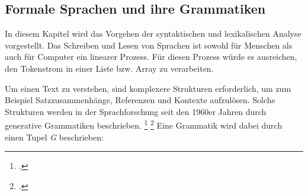 




\pagebreak
   
   
\subsection{Formale Sprachen und ihre Grammatiken}
% 
In diesem Kapitel wird das Vorgehen der syntaktischen und lexikalischen Analyse vorgestellt. Das Schreiben und Lesen von Sprachen ist sowohl für Menschen als auch für Computer ein linearer Prozess. Für diesen Prozess würde es ausreichen, den Tokenstrom in einer Liste bzw. Array zu verarbeiten.

Um einen Text zu verstehen, sind komplexere Strukturen erforderlich, um zum Beispiel Satzzusammenhänge, Referenzen und Kontexte aufzulösen. Solche Strukturen werden in der Sprachforschung seit den 1960er Jahren durch generative Grammatiken beschrieben. \footcite[Vgl. ][S. 117]{choms} \footcite[Vgl. ][S. 149ff. ]{automata}
Eine Grammatik wird dabei durch einen Tupel \emph{G} beschrieben:

